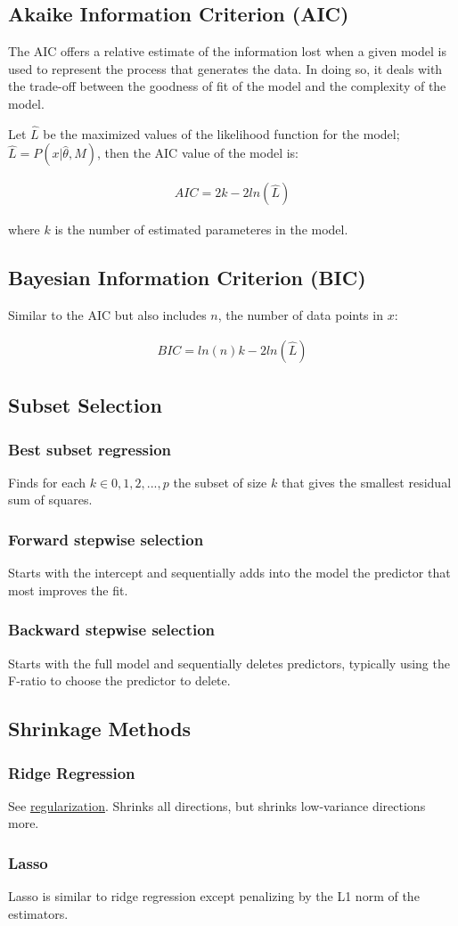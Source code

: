 \documentclass[12pt]{article}
\begin{document}
\subsection{Akaike Information Criterion (AIC)}
The AIC offers a relative estimate of the information lost when a given model is used to represent the process that generates the data. In doing so, it deals with the trade-off between the goodness of fit of the model and the complexity of the model.

Let $\hat{L}$ be the maximized values of the likelihood function for the model; $\hat{L} = P(x|\hat{\theta},M)$, then the AIC value of the model is:

\begin{align*}
    AIC = 2k - 2ln(\hat{L})
\end{align*}

where $k$ is the number of estimated parameteres in the model.

\subsection{Bayesian Information Criterion (BIC)}
Similar to the AIC but also includes $n$, the number of data points in $x$:

\begin{align*}
    BIC = ln(n)k - 2ln(\hat{L})
\end{align*}

\subsection{Subset Selection}
\subsubsection{Best subset regression}
Finds for each $k \in {0, 1, 2,...,p}$ the subset of size $k$ that gives the smallest residual sum of squares.
\subsubsection{Forward stepwise selection}
Starts with the intercept and sequentially adds into the model the predictor that most improves the fit.
\subsubsection{Backward stepwise selection}
Starts with the full model and sequentially deletes predictors, typically using the F-ratio to choose the predictor to delete.

\subsection{Shrinkage Methods}
\subsubsection{Ridge Regression}
See \hyperref[sec:regularization]{regularization}. Shrinks all directions, but shrinks low-variance directions more.
\subsubsection{Lasso}
Lasso is similar to ridge regression except penalizing by the L1 norm of the estimators.
\end{document}
